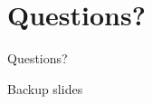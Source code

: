 \section{Questions?}
\begin{darkframes}
	\begin{frame}
		\huge Questions?
	\end{frame}
\end{darkframes}

\begin{darkframes}
	\begin{frame}
		\huge Backup slides
	\end{frame}
\end{darkframes}

